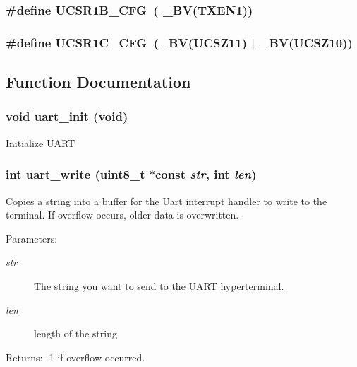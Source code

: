 \subsubsection{\setlength{\rightskip}{0pt plus 5cm}\#define UCSR1B\_\-CFG~( \_\-BV(TXEN1))}\label{uart_2uart_8h_245745fb819d18a2a304fff4e9449e33}


\subsubsection{\setlength{\rightskip}{0pt plus 5cm}\#define UCSR1C\_\-CFG~(\_\-BV(UCSZ11) $|$ \_\-BV(UCSZ10))}\label{uart_2uart_8h_79a1da1a63ad2dd6526d40febedfec8f}




\subsection{Function Documentation}
\subsubsection{\setlength{\rightskip}{0pt plus 5cm}void uart\_\-init (void)}\label{uart_2uart_8h_0c0ca72359ddf28dcd15900dfba19343}


Initialize UART 
\subsubsection{\setlength{\rightskip}{0pt plus 5cm}int uart\_\-write (uint8\_\-t $\ast$const  {\em str}, int {\em len})}\label{uart_2uart_8h_2f98501ce8efc928a596b54a157cc3f0}


Copies a string into a buffer for the Uart interrupt handler to write to the terminal. If overflow occurs, older data is overwritten.

\begin{Desc}
\item[Parameters:]
\begin{description}
\item[{\em str}]The string you want to send to the UART hyperterminal. \item[{\em len}]length of the string\end{description}
\end{Desc}
\begin{Desc}
\item[Returns:]-1 if overflow occurred. \end{Desc}
